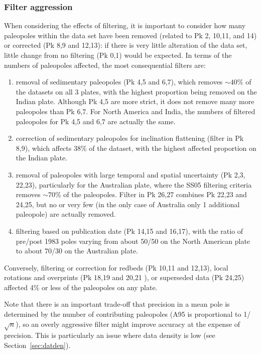 \subsubsection{Filter aggression}

When considering the effects of filtering, it is important to consider how many
paleopoles within the data set have been removed (related to Pk 2,
10,11, and 14) or corrected (Pk 8,9 and 12,13): if there is very
little alteration of the data set, little change from no filtering (Pk 0,1)
would be expected. In terms of the numbers of paleopoles affected, the most
consequential filters are:
%
\begin{enumerate}
  \item removal of sedimentary paleopoles (Pk 4,5 and 6,7), which removes
		${\sim}40$\% of the datasets on all 3 plates, with the
		highest proportion being removed on the Indian plate. Although Pk 4,5
		are more strict, it does not remove many more paleopoles than Pk 6,7.
		For North America and India, the numbers of filtered paleopoles for Pk
		4,5 and 6,7 are actually the same.
  \item correction of sedimentary paleopoles for inclination flattening (filter
		in Pk 8,9), which affects 38\% of the dataset, with the
		highest affected proportion on the Indian plate.
  \item removal of paleopoles with large temporal and spatial uncertainty (Pk
		2,3, 22,23), particularly for the Australian plate, where the SS05
		filtering criteria removes ${\sim}70$\% of the paleopoles. Filter in Pk
		26,27 combines Pk 22,23 and 24,25, but no or very few (in the only case
		of Australia only 1 additional paleopole) are actually removed.
  \item filtering based on publication date (Pk 14,15 and 16,17), with the
		ratio of pre/post 1983 poles varying from about 50/50 on the North
		American plate to about 70/30 on the Australian plate.
\end{enumerate}

Conversely, filtering or correction for redbeds (Pk 10,11 and 12,13), local
rotations and overprints (Pk 18,19 and 20,21%
), or superseded data (Pk 24,25) affected 4\% or less of
the paleopoles on any plate.

Note that there is an important trade-off that precision in a mean pole is
determined by the number of contributing paleopoles (A95 is proportional to
1/$\sqrt{n}$), so an overly aggressive filter might improve accuracy at the
expense of precision. This is particularly an issue where data density is low
(see Section~\ref{sec:datden}).

